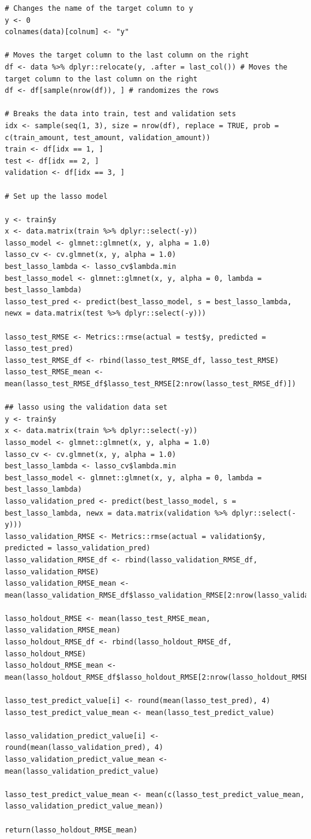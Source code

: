 \documentclass[
]{book}
\begin{document}
\begin{verbatim}
# Changes the name of the target column to y
y <- 0
colnames(data)[colnum] <- "y"

# Moves the target column to the last column on the right
df <- data %>% dplyr::relocate(y, .after = last_col()) # Moves the target column to the last column on the right
df <- df[sample(nrow(df)), ] # randomizes the rows

# Breaks the data into train, test and validation sets
idx <- sample(seq(1, 3), size = nrow(df), replace = TRUE, prob = c(train_amount, test_amount, validation_amount))
train <- df[idx == 1, ]
test <- df[idx == 2, ]
validation <- df[idx == 3, ]

# Set up the lasso model

y <- train$y
x <- data.matrix(train %>% dplyr::select(-y))
lasso_model <- glmnet::glmnet(x, y, alpha = 1.0)
lasso_cv <- cv.glmnet(x, y, alpha = 1.0)
best_lasso_lambda <- lasso_cv$lambda.min
best_lasso_model <- glmnet::glmnet(x, y, alpha = 0, lambda = best_lasso_lambda)
lasso_test_pred <- predict(best_lasso_model, s = best_lasso_lambda, newx = data.matrix(test %>% dplyr::select(-y)))

lasso_test_RMSE <- Metrics::rmse(actual = test$y, predicted = lasso_test_pred)
lasso_test_RMSE_df <- rbind(lasso_test_RMSE_df, lasso_test_RMSE)
lasso_test_RMSE_mean <- mean(lasso_test_RMSE_df$lasso_test_RMSE[2:nrow(lasso_test_RMSE_df)])

## lasso using the validation data set
y <- train$y
x <- data.matrix(train %>% dplyr::select(-y))
lasso_model <- glmnet::glmnet(x, y, alpha = 1.0)
lasso_cv <- cv.glmnet(x, y, alpha = 1.0)
best_lasso_lambda <- lasso_cv$lambda.min
best_lasso_model <- glmnet::glmnet(x, y, alpha = 0, lambda = best_lasso_lambda)
lasso_validation_pred <- predict(best_lasso_model, s = best_lasso_lambda, newx = data.matrix(validation %>% dplyr::select(-y)))
lasso_validation_RMSE <- Metrics::rmse(actual = validation$y, predicted = lasso_validation_pred)
lasso_validation_RMSE_df <- rbind(lasso_validation_RMSE_df, lasso_validation_RMSE)
lasso_validation_RMSE_mean <- mean(lasso_validation_RMSE_df$lasso_validation_RMSE[2:nrow(lasso_validation_RMSE_df)])

lasso_holdout_RMSE <- mean(lasso_test_RMSE_mean, lasso_validation_RMSE_mean)
lasso_holdout_RMSE_df <- rbind(lasso_holdout_RMSE_df, lasso_holdout_RMSE)
lasso_holdout_RMSE_mean <- mean(lasso_holdout_RMSE_df$lasso_holdout_RMSE[2:nrow(lasso_holdout_RMSE_df)])

lasso_test_predict_value[i] <- round(mean(lasso_test_pred), 4)
lasso_test_predict_value_mean <- mean(lasso_test_predict_value)

lasso_validation_predict_value[i] <- round(mean(lasso_validation_pred), 4)
lasso_validation_predict_value_mean <- mean(lasso_validation_predict_value)

lasso_test_predict_value_mean <- mean(c(lasso_test_predict_value_mean, lasso_validation_predict_value_mean))

return(lasso_holdout_RMSE_mean)
\end{verbatim}
\end{document}
